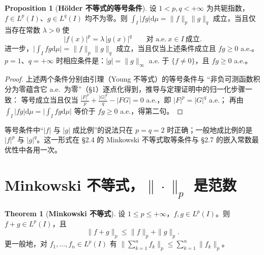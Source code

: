 \documentclass[oneside]{book}
\theoremstyle{definition}
\newcommand{\dd}{\mathrm{d}}
\theoremstyle{definition}
\newtheorem{proposition}{Proposition}[section]
\newtheorem{theorem}{Theorem}[section]
\begin{document}
	\begin{proposition}[\bfseries{Hölder 不等式的等号条件}]
		设 $1<p,q<+\infty$ 为共轭指数，$f\in L^p(I)$、$g\in L^q(I)$ 均不为零。则
		$\int_I|fg|\dd\mu=\|f\|_p\|g\|_q$ 成立，当且仅当存在常数 $\lambda>0$ 使
		\[
		|f(x)|^p=\lambda\,|g(x)|^q\qquad\text{对 a.e.}\ x\in I\ \text{成立}.
		\]
		进一步，$\bigl|\int_I fg\dd\mu\bigr|=\|f\|_p\|g\|_q$ 成立，当且仅当上述条件成立且 $fg\geqslant0$ a.e.。
		$p=1$、$q=+\infty$ 时相应条件是：$|g|=\|g\|_\infty$ a.e. 于 $\{f\ne0\}$，且 $fg\geqslant0$ a.e.。
	\end{proposition}
	
	\begin{proof}
		上述两个条件分别由引理（Young 不等式）的等号条件与
		“非负可测函数积分为零蕴含它 a.e.\ 为零”（§1）逐点化得到，推导与定理证明中的归一化步骤一致：
		等号成立当且仅当 $\frac{|F|^p}{p}+\frac{|G|^q}{q}-|FG|=0$ a.e.，即 $|F|^p=|G|^q$ a.e.；
		再由 $\int_I|fg|\dd\mu=\bigl|\int_I fg\dd\mu\bigr|$ 等价于 $fg\geqslant0$ a.e.，得第二句。
	\end{proof}
	
	等号条件中“$|f|$ 与 $|g|$ 成比例”的说法只在 $p=q=2$ 时正确；一般地成比例的是
	$|f|^p$ 与 $|g|^q$。这一形式在 §2.4 的 Minkowski 不等式取等条件与 §2.7 的嵌入常数最优性中各用一次。
	
	\section{Minkowski 不等式，$\|\cdot\|_p$ 是范数}
	
	\begin{theorem}[\bfseries{Minkowski 不等式}]
		设 $1\leqslant p\leqslant+\infty$，$f,g\in L^p(I)$。则 $f+g\in L^p(I)$，且
		\[
		\|f+g\|_p\leqslant\|f\|_p+\|g\|_p .
		\]
		更一般地，对 $f_1,\dots,f_n\in L^p(I)$ 有
		$\bigl\|\sum_{k=1}^n f_k\bigr\|_p\leqslant\sum_{k=1}^n\|f_k\|_p$。
	\end{theorem}
	
\end{document}
